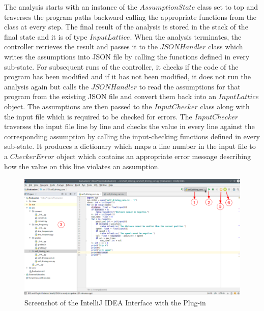 \documentclass[10pt]{report}
\begin{document}
The analysis starts with an instance of the $ AssumptionState $ class set to top and traverses the program paths backward calling the appropriate functions from the class at every step. The final result of the analysis is stored in the stack of the final state and it is of type $ InputLattice $. When the analysis terminates, the controller retrieves the result and passes it to the $ JSONHandler $ class which writes the assumptions into JSON file by calling the functions defined in every sub-state. For subsequent runs of the controller, it checks if the code of the program has been modified and if it has not been modified, it does not run the analysis again but calls the $ JSONHandler $ to read the assumptions for that program from the existing JSON file and convert them back into an $ InputLattice $ object. The assumptions are then passed to the $ InputChecker $ class along with the input file which is required to be checked for errors. The $ InputChecker $ traverses the input file line by line and checks the value in every line against the corresponding assumption by calling the input-checking functions defined in every sub-state. It produces a dictionary which maps a line number in the input file to a $ CheckerError $ object which contains an appropriate error message describing how the value on this line violates an assumption. 

\begin{figure}[H]
	\includegraphics[width=\linewidth]{tool-labeled.png}
	\caption{Screenshot of the IntelliJ IDEA Interface with the Plug-in}
	\label{tool}
\end{figure}
\end{document}
